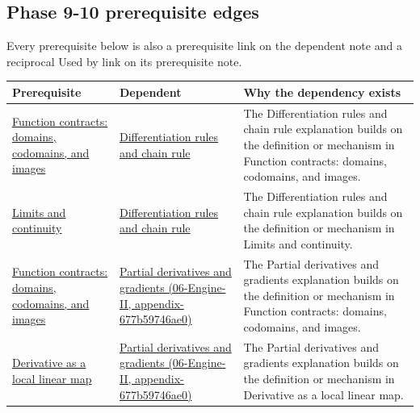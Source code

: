 \subsection{Phase 9-10 prerequisite edges}\label{phase-9-10-prerequisite-edges}

Every prerequisite below is also a prerequisite link on the dependent note and a reciprocal Used by link on its prerequisite note.

{\def\LTcaptype{none} %
\begin{longtable}[]{@{}
  >{\raggedright\arraybackslash}p{}
  >{\raggedright\arraybackslash}p{}
  >{\raggedright\arraybackslash}p{}@{}}
\toprule\noalign{}
\begin{minipage}[b]{\linewidth}\raggedright
Prerequisite
\end{minipage} & \begin{minipage}[b]{\linewidth}\raggedright
Dependent
\end{minipage} & \begin{minipage}[b]{\linewidth}\raggedright
Why the dependency exists
\end{minipage} \\
\midrule\noalign{}
\endhead
\bottomrule\noalign{}
\endlastfoot
\hyperref[appendix-a59658325cd6]{Function contracts: domains, codomains, and images} & \hyperref[appendix-d9f70bdfbc92]{Differentiation rules and chain rule} & The Differentiation rules and chain rule explanation builds on the definition or mechanism in Function contracts: domains, codomains, and images. \\
\hyperref[appendix-fecc1847f5a3]{Limits and continuity} & \hyperref[appendix-d9f70bdfbc92]{Differentiation rules and chain rule} & The Differentiation rules and chain rule explanation builds on the definition or mechanism in Limits and continuity. \\
\hyperref[appendix-a59658325cd6]{Function contracts: domains, codomains, and images} & \href{}{Partial derivatives and gradients (06-Engine-II, appendix-677b59746ae0)} & The Partial derivatives and gradients explanation builds on the definition or mechanism in Function contracts: domains, codomains, and images. \\
\hyperref[appendix-7bc181935c42]{Derivative as a local linear map} & \href{}{Partial derivatives and gradients (06-Engine-II, appendix-677b59746ae0)} & The Partial derivatives and gradients explanation builds on the definition or mechanism in Derivative as a local linear map. \\

\end{longtable}}
